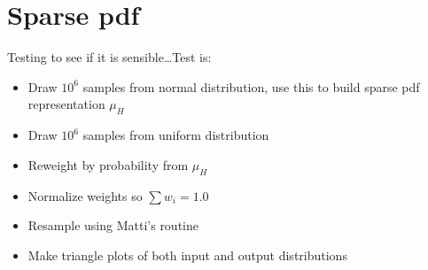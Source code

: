 \documentclass{tufte-handout}
\begin{document}



\section{Sparse pdf}
Testing to see if it is sensible\ldots Test is:
\begin{itemize}
    \item Draw $10^6$ samples from normal distribution, use this to build sparse pdf representation $\mu_H$
    \item Draw $10^6$ samples from uniform distribution
    \item Reweight by probability from $\mu_H$
    \item Normalize weights so $\sum w_i = 1.0$
    \item Resample using Matti's routine
    \item Make triangle plots of both input and output distributions
\end{itemize}
\end{document}
